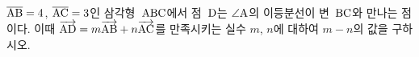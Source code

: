 $\seg{AB}=4$, $\seg{AC}=3$인 삼각형~$\pt{ABC}$에서 점~$\pt{D}$는 $\angle\pt{A}$의 이등분선이 변~$\pt{BC}$와 만나는 점이다. 이때 $\vecAB{AD}=m\vecAB{AB}+n\vecAB{AC}$를 만족시키는 실수 $m$, $n$에 대하여 $m-n$의 값을 구하시오.
